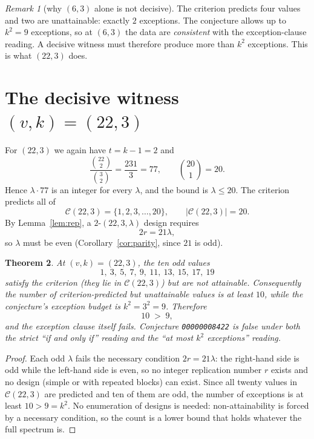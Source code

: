 \documentclass[11pt]{article}
\newtheorem{theorem}{Theorem}
\theoremstyle{definition}
\theoremstyle{remark}
\newtheorem{remark}[theorem]{Remark}
\begin{document}
\begin{remark}[why $(6,3)$ alone is not decisive]
The criterion predicts four values and two are unattainable: exactly $2$
exceptions. The conjecture allows up to $k^{2}=9$ exceptions, so at $(6,3)$ the
data are \emph{consistent} with the exception-clause reading. A decisive
witness must therefore produce more than $k^{2}$ exceptions. This is what
$(22,3)$ does.
\end{remark}

\section{The decisive witness $(v,k)=(22,3)$}

For $(22,3)$ we again have $t=k-1=2$ and
\[
\frac{\binom{22}{2}}{\binom{3}{2}}=\frac{231}{3}=77,
\qquad
\binom{20}{1}=20 .
\]
Hence $\lambda\cdot 77$ is an integer for every $\lambda$, and the bound is
$\lambda\le 20$. The criterion predicts all of
\[
\mathcal C(22,3)=\{1,2,3,\dots,20\},\qquad |\mathcal C(22,3)|=20 .
\]
By Lemma~\ref{lem:rep}, a $2$-$(22,3,\lambda)$ design requires
\[
2r=21\lambda,
\]
so $\lambda$ must be even (Corollary~\ref{cor:parity}, since $21$ is odd).

\begin{theorem}\label{thm:twentytwo}
At $(v,k)=(22,3)$, the ten odd values
\[
1,\ 3,\ 5,\ 7,\ 9,\ 11,\ 13,\ 15,\ 17,\ 19
\]
satisfy the criterion (they lie in $\mathcal C(22,3)$) but are \emph{not}
attainable. Consequently the number of criterion-predicted but unattainable
values is at least $10$, while the conjecture's exception budget is
$k^{2}=3^{2}=9$. Therefore
\[
10 \;>\; 9,
\]
and the exception clause itself fails. Conjecture \texttt{00000008422} is
false under both the strict ``if and only if'' reading and the ``at most $k^{2}$
exceptions'' reading.
\end{theorem}

\begin{proof}
Each odd $\lambda$ fails the necessary condition $2r=21\lambda$: the right-hand
side is odd while the left-hand side is even, so no integer replication number
$r$ exists and no design (simple or with repeated blocks) can exist. Since all
twenty values in $\mathcal C(22,3)$ are predicted and ten of them are odd, the
number of exceptions is at least $10>9=k^{2}$. No enumeration of designs is
needed: non-attainability is forced by a necessary condition, so the count is a
lower bound that holds whatever the full spectrum is.
\end{proof}
\end{document}
